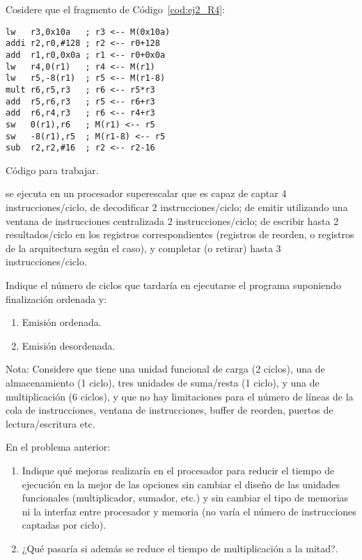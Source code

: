 \begin{ejercicio}
    Cosidere que el fragmento de Código~\ref{cod:ej2_R4}:
    \begin{listing}[H]
    \begin{verbatim}
lw   r3,0x10a   ; r3 <-- M(0x10a)
addi r2,r0,#128 ; r2 <-- r0+128
add  r1,r0,0x0a ; r1 <-- r0+0x0a
lw   r4,0(r1)   ; r4 <-- M(r1)
lw   r5,-8(r1)  ; r5 <-- M(r1-8)
mult r6,r5,r3   ; r6 <-- r5*r3
add  r5,r6,r3   ; r5 <-- r6+r3
add  r6,r4,r3   ; r6 <-- r4+r3
sw   0(r1),r6   ; M(r1) <-- r5
sw   -8(r1),r5  ; M(r1-8) <-- r5
sub  r2,r2,#16  ; r2 <-- r2-16
    \end{verbatim}
    \caption{Código para trabajar.}
    \label{cod:ej2_R4}
    \end{listing}
se ejecuta en un procesador superescalar que es capaz de captar 4 instrucciones/ciclo, de decodificar 2 instrucciones/ciclo; de emitir utilizando una ventana de instrucciones centralizada 2 instrucciones/ciclo; de escribir hasta 2 resultados/ciclo en los registros correspondientes (registros de reorden, o registros de la arquitectura según el caso), y completar (o retirar) hasta 3 instrucciones/ciclo.

Indique el número de ciclos que tardaría en ejecutarse el programa suponiendo finalización ordenada y:
\begin{enumerate}
    \item Emisión ordenada.
    \item Emisión desordenada.
\end{enumerate}
Nota: Considere que tiene una unidad funcional de carga (2 ciclos), una de almacenamiento (1 ciclo), tres unidades de suma/resta (1 ciclo), y una de multiplicación (6 ciclos), y que no hay limitaciones para el número de líneas de la cola de instrucciones, ventana de instrucciones, buffer de reorden, puertos de lectura/escritura etc.
\end{ejercicio}

\begin{ejercicio}\label{ej:3_R4}
   En el problema anterior: 
   \begin{enumerate}
       \item Indique qué mejoras realizaría en el procesador para reducir el tiempo de ejecución en la mejor de las opciones sin cambiar el diseño de las unidades funcionales (multiplicador, sumador, etc.) y sin cambiar el tipo de memorias ni la interfaz entre procesador y memoria (no varía el número de instrucciones captadas por ciclo).
       \item ¿Qué pasaría si además se reduce el tiempo de multiplicación a la mitad?. 
   \end{enumerate}
\end{ejercicio}

